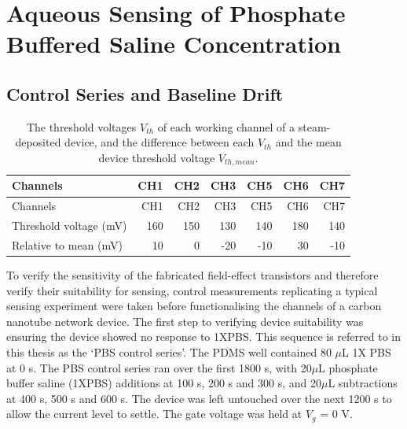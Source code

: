 \documentclass[
  a4paper,
]{scrbook}
\begin{document}
\hypertarget{sec-dummy-sensing}{%
\section{Aqueous Sensing of Phosphate Buffered Saline
Concentration}\label{sec-dummy-sensing}}

\hypertarget{sec-baseline-drift}{%
\subsection{Control Series and Baseline
Drift}\label{sec-baseline-drift}}

\hypertarget{tbl-threshold-voltages}{}
\begin{longtable}[]{@{}lrrrrrr@{}}
\caption{\label{tbl-threshold-voltages}The threshold voltages \(V_{th}\)
of each working channel of a steam-deposited device, and the difference
between each \(V_{th}\) and the mean device threshold voltage
\(V_{th, mean}\).\\
}\tabularnewline
\toprule\noalign{}
Channels & CH1 & CH2 & CH3 & CH5 & CH6 & CH7 \\
\midrule\noalign{}
\endfirsthead
\toprule\noalign{}
Channels & CH1 & CH2 & CH3 & CH5 & CH6 & CH7 \\
\midrule\noalign{}
\endhead
\bottomrule\noalign{}
\endlastfoot
Threshold voltage (mV) & 160 & 150 & 130 & 140 & 180 & 140 \\
Relative to mean (mV) & 10 & 0 & -20 & -10 & 30 & -10 \\
\end{longtable}

To verify the sensitivity of the fabricated field-effect transistors and
therefore verify their suitability for sensing, control measurements
replicating a typical sensing experiment were taken before
functionalising the channels of a carbon nanotube network device. The
first step to verifying device suitability was ensuring the device
showed no response to 1XPBS. This sequence is referred to in this thesis
as the `PBS control series'. The PDMS well contained 80 \(\mu\)L 1X PBS
at 0 s. The PBS control series ran over the first 1800 s, with
20\(\mu\)L phosphate buffer saline (1XPBS) additions at 100 s, 200 s and
300 s, and 20\(\mu\)L subtractions at 400 s, 500 s and 600 s. The device
was left untouched over the next 1200 s to allow the current level to
settle. The gate voltage was held at \(V_g\) = 0 V.
\end{document}
